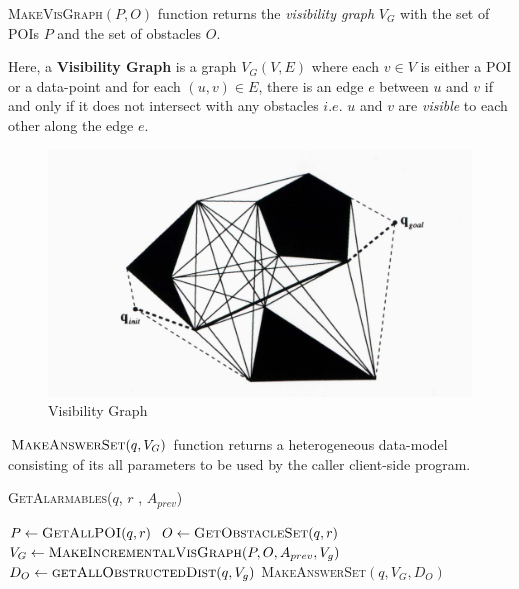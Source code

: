 \textsc{MakeVisGraph}$(P,O)$ function returns the \textit{visibility graph} $V_G$ with the set of POIs $P$ and the set of obstacles $O$.

Here, a \textbf{Visibility Graph} is a graph $V_G(V,E)$ where each $v \in V$ is either a POI or a data-point and for each $(u,v) \in E$, there is an edge $e$ between $u$ and $v$ if and only if it does not intersect with any obstacles $i.e.$ $u$ and $v$ are \textit{visible} to each other along the edge $e$.\\

\begin{figure}[h]
  \includegraphics[width=\linewidth]{visibility_graph.jpg}
  \caption{Visibility Graph}
  \label{fig:visgraph}
\end{figure}
\vspace{5pt}
$\textsc{MakeAnswerSet}(q, V_G)$ function returns a heterogeneous data-model consisting of its all parameters to be used by the caller client-side program.


\DontPrintSemicolon
\begin{algorithm}
\caption{\textsc{GetAlarmables}($q$, $r$ , $A_{prev}$)}
	
	 $P \gets \textsc{GetAllPOI}(q, r)$ \;
	 $O \gets \textsc{GetObstacleSet}(q, r)$ \;
	 $V_G \gets \textsc{MakeIncrementalVisGraph}(P, O, A_{prev},V_g)$ \;
	 $D_O \gets \textsc{getAllObstructedDist}( q, V_g )$
	\Return \textsc{MakeAnswerSet}$(q, V_G,D_O)$ \;
\label{GetAlarmables}
\end{algorithm}

